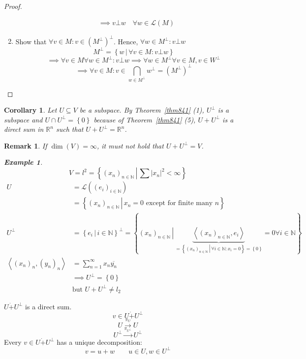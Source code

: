 \documentclass[a4paper]{article}
\newcounter{lecref}[section]
\numberwithin{lecref}{section}
\newtheorem*{Example}{Example}
\newtheorem{remark}[lecref]{Remark}
\newtheorem{corollary}[lecref]{Corollary}
\newcommand{\set}[1]{\left\{#1\right\}}
\newcommand{\setdef}[2]{\left\{\left.#1\,\right|\,#2\right\}}
\newcommand{\ip}[2]{\left\langle#1,#2\right\rangle} %
\newcommand{\card}[1]{\left|#1\right|}
\begin{document}
\begin{proof}
\begin{enumerate}
\begin{align*}
               & \implies v \bot w \quad \forall w \in \mathcal L(M)
      \end{align*}
    \item Show that $\forall v \in M: v \in (M^\bot)^\bot$. Hence, $\forall w \in M^\bot: v \bot w$
      \[ M^\bot = \setdef{w}{\forall v \in M: v \bot w} \]
      \[ \implies \forall v \in M \forall w \in M^\bot: v \bot w \implies \forall w \in M^\bot \forall v \in M, v \in W^\bot \]
      \[ \implies \forall v \in M: v \in \bigcap_{w \in M^\bot} w^\bot = (M^\bot)^\bot \]
  \end{enumerate}
\end{proof}

\begin{corollary} %
  Let $U \subseteq V$ be a subspace.
  By Theorem~\ref{thm841} (1), $U^\bot$ is a subspace and $U \cap U^\bot = \set{0}$
  because of Theorem~\ref{thm841} (5), $U + U^\bot$ is a direct sum in $\mathbb R^n$ such that $U + U^\bot = \mathbb R^n$.
\end{corollary}

\begin{remark} %
  If $\dim(V) = \infty$, it must not hold that $U + U^\bot = V$.
  \begin{Example}
    \[ V = l^2 = \setdef{(x_n)_{n \in \mathbb N}}{\sum \card{x_n}^2 < \infty} \]
    \begin{align*}
      U &= \mathcal L((e_i)_{i \in \mathbb N}) \\
        &= \setdef{(x_n)_{n \in \mathbb N}}{x_n = 0 \text{ except for finite many } n} \\
      U^\bot &= \setdef{e_i}{i \in \mathbb N}^\bot = \setdef{(x_n)_{n \in \mathbb N}}{\underbrace{\ip{(x_n)_{n \in \mathbb N}}{e_i}}_{= \setdef{(x_n)_{n \in \mathbb N}}{\forall i \in \mathbb N: x_i = 0} = \set{0}} = 0 \forall i \in \mathbb N} \\
      \ip{(x_n)_{n}}{(y_n)_{n}} &= \sum_{n=1}^\infty x_n \overline{y_n} \\
        &\implies U^\bot = \set{0} \\
        &\text{but } U + U^\bot \neq l_2
    \end{align*}
  \end{Example}
\end{remark}

$U \dot{+} U^\bot$ is a direct sum.
\[ v \in U \dot{+} U^\bot \]
\[ U \xrightarrow{\pi_U} U \]
\[ U^\bot \xrightarrow{\pi_{U^\bot}} U^\bot \]
Every $v \in U \dot{+} U^\bot$ has a unique decomposition:
\[ v = u + w \qquad u \in U, w \in U^\bot \]
\end{document}
